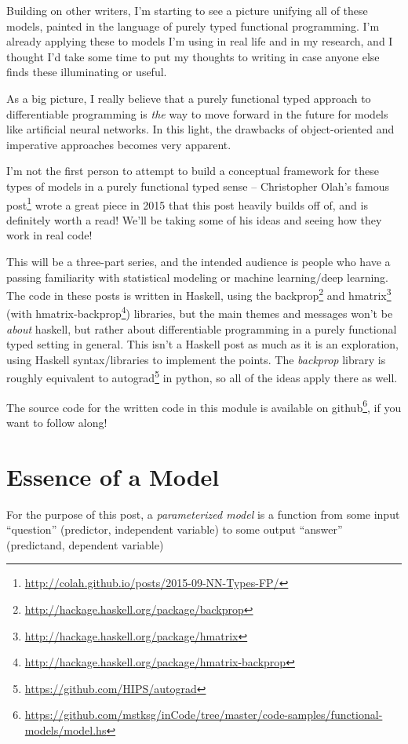 \documentclass[]{article}
\renewcommand{\href}[2]{#2\footnote{\url{#1}}}
\begin{document}
Building on other writers, I'm starting to see a picture unifying all of these
models, painted in the language of purely typed functional programming. I'm
already applying these to models I'm using in real life and in my research, and
I thought I'd take some time to put my thoughts to writing in case anyone else
finds these illuminating or useful.

As a big picture, I really believe that a purely functional typed approach to
differentiable programming is \emph{the} way to move forward in the future for
models like artificial neural networks. In this light, the drawbacks of
object-oriented and imperative approaches becomes very apparent.

I'm not the first person to attempt to build a conceptual framework for these
types of models in a purely functional typed sense --
\href{http://colah.github.io/posts/2015-09-NN-Types-FP/}{Christopher Olah's
famous post} wrote a great piece in 2015 that this post heavily builds off of,
and is definitely worth a read! We'll be taking some of his ideas and seeing how
they work in real code!

This will be a three-part series, and the intended audience is people who have a
passing familiarity with statistical modeling or machine learning/deep learning.
The code in these posts is written in Haskell, using the
\href{http://hackage.haskell.org/package/backprop}{backprop} and
\href{http://hackage.haskell.org/package/hmatrix}{hmatrix} (with
\href{http://hackage.haskell.org/package/hmatrix-backprop}{hmatrix-backprop})
libraries, but the main themes and messages won't be \emph{about} haskell, but
rather about differentiable programming in a purely functional typed setting in
general. This isn't a Haskell post as much as it is an exploration, using
Haskell syntax/libraries to implement the points. The \emph{backprop} library is
roughly equivalent to \href{https://github.com/HIPS/autograd}{autograd} in
python, so all of the ideas apply there as well.

The source code for the written code in this module is available
\href{https://github.com/mstksg/inCode/tree/master/code-samples/functional-models/model.hs}{on
github}, if you want to follow along!

\section{Essence of a Model}\label{essence-of-a-model}

For the purpose of this post, a \emph{parameterized model} is a function from
some input ``question'' (predictor, independent variable) to some output
``answer'' (predictand, dependent variable)
\end{document}
